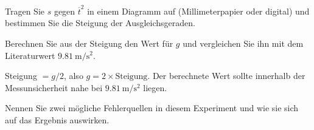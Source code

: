 
\begin{questions}

  \question[3] Tragen Sie $s$ gegen $\overline{t}^2$ in einem Diagramm auf
  (Millimeterpapier oder digital) und bestimmen Sie die Steigung der
  Ausgleichsgeraden.

  \question[3] Berechnen Sie aus der Steigung den Wert für $g$ und
  vergleichen Sie ihn mit dem Literaturwert $\SI{9.81}{\meter\per\second\squared}$.

  \begin{solution}
    Steigung $= g/2$, also $g = 2 \times \text{Steigung}$. Der berechnete
    Wert sollte innerhalb der Messunsicherheit nahe bei
    $\SI{9.81}{\meter\per\second\squared}$ liegen.
  \end{solution}

  \question[2] Nennen Sie zwei mögliche Fehlerquellen in diesem Experiment
  und wie sie sich auf das Ergebnis auswirken.

\end{questions}


